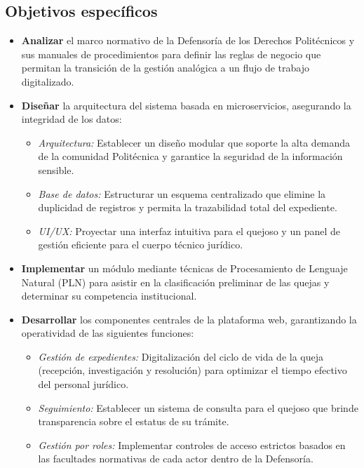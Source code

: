 \subsection{Objetivos específicos}
\begin{itemize}
    \item \textbf{Analizar} el marco normativo de la Defensoría de los Derechos Politécnicos y sus manuales de procedimientos para definir las reglas de negocio que permitan la transición de la gestión analógica a un flujo de trabajo digitalizado.
    
    \item \textbf{Diseñar} la arquitectura del sistema basada en microservicios, asegurando la integridad de los datos:
    \begin{itemize}
        \item \textit{Arquitectura:} Establecer un diseño modular que soporte la alta demanda de la comunidad Politécnica y garantice la seguridad de la información sensible.
        \item \textit{Base de datos:} Estructurar un esquema centralizado que elimine la duplicidad de registros y permita la trazabilidad total del expediente.
        \item \textit{UI/UX:} Proyectar una interfaz intuitiva para el quejoso y un panel de gestión eficiente para el cuerpo técnico jurídico.
    \end{itemize}

    \item \textbf{Implementar} un módulo mediante técnicas de Procesamiento de Lenguaje Natural (PLN) para asistir en la clasificación preliminar de las quejas y determinar su competencia institucional.

    \item \textbf{Desarrollar} los componentes centrales de la plataforma web, garantizando la operatividad de las siguientes funciones:
    \begin{itemize}
        \item \textit{Gestión de expedientes:} Digitalización del ciclo de vida de la queja (recepción, investigación y resolución) para optimizar el tiempo efectivo del personal jurídico.
        \item \textit{Seguimiento:} Establecer un sistema de consulta para el quejoso que brinde transparencia sobre el estatus de su trámite.
        \item \textit{Gestión por roles:} Implementar controles de acceso estrictos basados en las facultades normativas de cada actor dentro de la Defensoría.
    \end{itemize}
\end{itemize}